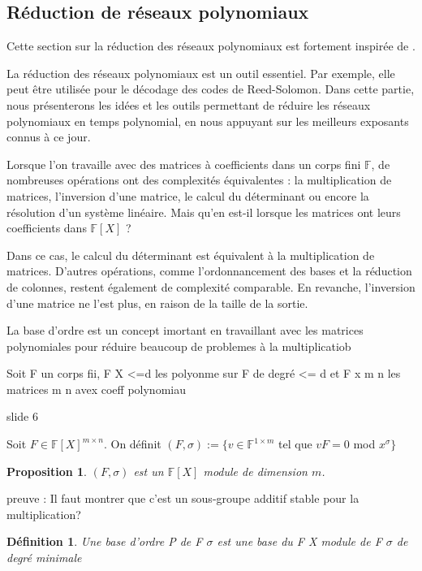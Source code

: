 \documentclass[a4paper,12pt]{report}  %
\theoremstyle{definitionstyle}
\newtheorem{definition}{Définition}[chapter] %
\theoremstyle{examplestyle}
\theoremstyle{remarkstyle}
\theoremstyle{propositionstyle}
\newtheorem{proposition}{Proposition}[chapter]  %
\theoremstyle{theoremstyle}
\begin{document}
	\subsection{Réduction de réseaux polynomiaux}
	Cette section sur la réduction des réseaux polynomiaux est fortement inspirée de \cite{CCLebreton}.  
	
	La réduction des réseaux polynomiaux est un outil essentiel. Par exemple, elle peut être utilisée pour le décodage des codes de Reed-Solomon. Dans cette partie, nous présenterons les idées et les outils permettant de réduire les réseaux polynomiaux en temps polynomial, en nous appuyant sur les meilleurs exposants connus à ce jour.  
	
	Lorsque l'on travaille avec des matrices à coefficients dans un corps fini \(\mathbb{F}\), de nombreuses opérations ont des complexités équivalentes : la multiplication de matrices, l'inversion d'une matrice, le calcul du déterminant ou encore la résolution d'un système linéaire. Mais qu'en est-il lorsque les matrices ont leurs coefficients dans \(\mathbb{F}[X]\) ?  
	
	Dans ce cas, le calcul du déterminant est équivalent à la multiplication de matrices. D'autres opérations, comme l'ordonnancement des bases et la réduction de colonnes, restent également de complexité comparable. En revanche, l'inversion d'une matrice ne l'est plus, en raison de la taille de la sortie.
	
	
	La base d'ordre est un concept imortant en travaillant avec les matrices polynomiales pour réduire beaucoup de problemes à la multiplicatiob
	
	Soit F un corps fii, F X <=d les polyonme sur F de degré <= d et F x m n les matrices m n avex coeff polynomiau
	
	slide 6
	
	
	Soit $F \in \mathbb{F}[X]^{m \times n}$. On définit $(F, \sigma):= \{v \in \mathbb{F}^{1 \times m}$ tel que $ vF = 0$ mod $x^\sigma\}$
	
	\begin{proposition}
		$(F, \sigma)$ est un $\mathbb{F}[X]$ module de dimension $m$.
	\end{proposition}

	preuve : Il faut montrer que c'est un sous-groupe additif stable pour la multiplication?
	
	
	\begin{definition}
		Une base d'ordre P de F $\sigma$
		 est une base du F X module de F $\sigma$ de degré minimale
	\end{definition}
	
\end{document}
